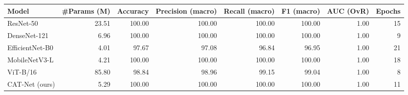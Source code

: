 \begin{tabular}{lrrrrrrr}
\toprule
Model & #Params (M) & Accuracy & Precision (macro) & Recall (macro) & F1 (macro) & AUC (OvR) & Epochs \\
\midrule
ResNet-50 & 23.51 & 100.00 & 100.00 & 100.00 & 100.00 & 1.00 & 15 \\
DenseNet-121 & 6.96 & 100.00 & 100.00 & 100.00 & 100.00 & 1.00 & 9 \\
EfficientNet-B0 & 4.01 & 97.67 & 97.08 & 96.84 & 96.95 & 1.00 & 21 \\
MobileNetV3-L & 4.21 & 100.00 & 100.00 & 100.00 & 100.00 & 1.00 & 18 \\
ViT-B/16 & 85.80 & 98.84 & 98.96 & 99.15 & 99.04 & 1.00 & 8 \\
CAT-Net (ours) & 5.29 & 100.00 & 100.00 & 100.00 & 100.00 & 1.00 & 11 \\
\bottomrule
\end{tabular}

